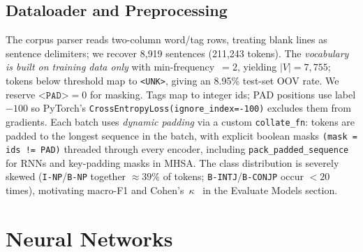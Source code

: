 \documentclass[10pt,a4paper,twocolumn]{article}
\begin{document}
\subsection*{Dataloader and Preprocessing}
The corpus parser reads two-column word/tag rows, treating blank lines as
sentence delimiters; we recover 8{,}919 sentences (211{,}243 tokens). The
\emph{vocabulary is built on training data only} with min-frequency~$=2$,
yielding $|V|=7{,}755$; tokens below threshold map to \texttt{<UNK>}, giving an
8.95\% test-set OOV rate. We reserve $\texttt{<PAD>}=0$ for masking. Tags map
to integer ids; PAD positions use label $-100$ so PyTorch's
\texttt{CrossEntropyLoss(ignore\_index=-100)} excludes them from gradients.
Each batch uses \emph{dynamic padding} via a custom \texttt{collate\_fn}: tokens
are padded to the longest sequence in the batch, with explicit boolean masks
\texttt{(mask = ids != PAD)} threaded through every encoder, including
\texttt{pack\_padded\_sequence} for RNNs and key-padding masks in MHSA. The
class distribution is severely skewed (\texttt{I-NP}/\texttt{B-NP} together
$\approx39\%$ of tokens; \texttt{B-INTJ}/\texttt{B-CONJP} occur ${<}20$ times),
motivating macro-F1 and Cohen's~$\kappa$~\citep{Cohen1960} in the Evaluate Models section.

\section*{Neural Networks}
\label{sec:nn}
\end{document}
